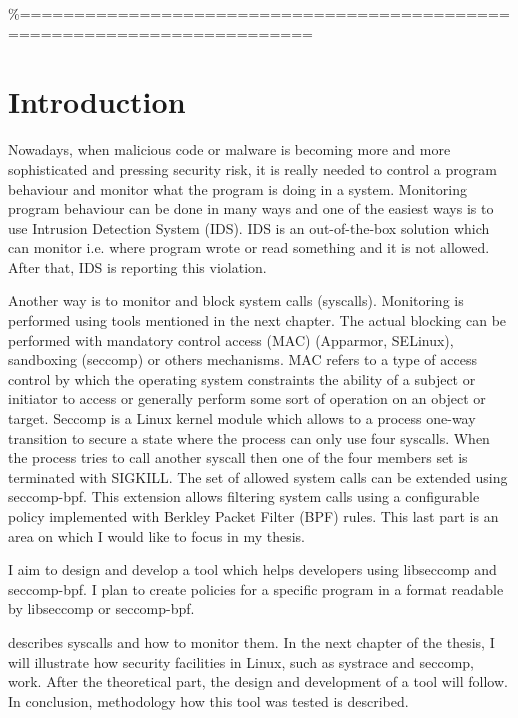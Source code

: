 \%=========================================================================



\chapter{Introduction}
Nowadays, when malicious code or malware is becoming more and more sophisticated and pressing security risk, it is really needed to control a program behaviour and monitor what the program is doing in a system.
Monitoring program behaviour can be done in many ways and one of the easiest ways is to use Intrusion Detection System (IDS).
IDS is an out-of-the-box solution which can monitor i.e. where program wrote or read something and it is not allowed.
After that, IDS is reporting this violation.

Another way is to monitor and block system calls (syscalls).
Monitoring is performed using tools mentioned in the next chapter.
The actual blocking can be performed with mandatory control access (MAC) (Apparmor, SELinux), sandboxing (seccomp) or others mechanisms.
MAC refers to a type of access control by which the operating system constraints the ability of a subject or initiator to access or generally perform some sort of operation on an object or target.
Seccomp is a Linux kernel module which allows to a process one-way transition to secure a state where the process can only use four syscalls.
When the process tries to call another syscall then one of the four members set is terminated with SIGKILL.
The set of allowed system calls can be extended using seccomp-bpf.
This extension allows filtering system calls using a configurable policy implemented with Berkley Packet Filter (BPF) rules.
This last part is an area on which I would like to focus in my thesis.

I aim to design and develop a tool which helps developers using libseccomp and seccomp-bpf.
I plan to create policies for a specific program in a format readable by libseccomp or seccomp-bpf.

 describes syscalls and how to monitor them.
In the next chapter of the thesis, I will illustrate how security facilities in Linux, such as systrace and seccomp, work.
After the theoretical part, the design and development of a tool will follow.
In conclusion, methodology how this tool was tested is described.

